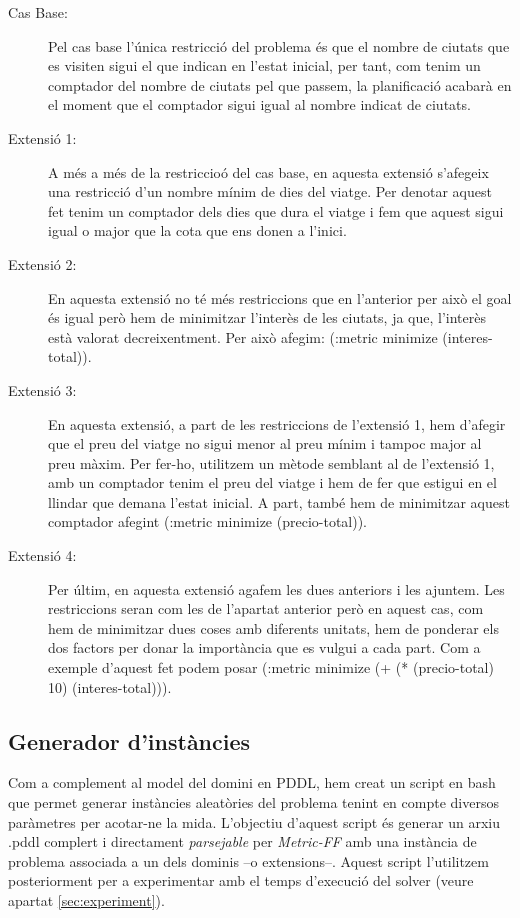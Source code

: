 \documentclass[11pt,a4paper]{article}
\begin{document}
\begin{description}
\item[Cas Base:] Pel cas base l'única restricció del problema és que el nombre de ciutats que es visiten sigui el que indican en l'estat inicial, per tant, com tenim un comptador del nombre de ciutats pel que passem, la planificació acabarà en el moment que el comptador sigui igual al nombre indicat de ciutats.

\item[Extensió 1:] A més a més de la restriccioó del cas base, en aquesta extensió s'afegeix una restricció d'un nombre mínim de dies del viatge. Per denotar aquest fet tenim un comptador dels dies que dura el viatge i fem que aquest sigui igual o major que la cota que ens donen a l'inici.

\item[Extensió 2:] En aquesta extensió no té més restriccions que en l'anterior per això el goal és igual però hem de minimitzar l'interès de les ciutats, ja que, l'interès està valorat decreixentment. Per això afegim: (:metric minimize (interes-total)).
\item[Extensió 3:] En aquesta extensió, a part de les restriccions de l'extensió 1, hem d'afegir que el preu del viatge no sigui menor al preu mínim i tampoc major al preu màxim. Per fer-ho, utilitzem un mètode semblant al de l'extensió 1, amb un comptador tenim el preu del viatge i hem de fer que estigui en el llindar que demana l'estat inicial.
A part, també hem de minimitzar aquest comptador afegint (:metric minimize (precio-total)).
\item[Extensió 4:] Per últim, en aquesta extensió agafem les dues anteriors i les ajuntem. Les restriccions seran com les de l'apartat anterior però en aquest cas, com hem de minimitzar dues coses amb diferents unitats, hem de ponderar els dos factors per donar la importància que es vulgui a cada part. Com a exemple d'aquest fet podem posar (:metric minimize (+ (* (precio-total) 10) (interes-total))).
\end{description}


\subsection{Generador d'instàncies}
\label{sec:script}

Com a complement al model del domini en PDDL, hem creat un script en bash que permet generar instàncies aleatòries del problema tenint en compte diversos paràmetres per acotar-ne la mida. L'objectiu d'aquest script és generar un arxiu .pddl complert i directament \emph{parsejable} per \emph{Metric-FF} amb una instància de problema associada a un dels dominis --o extensions--. Aquest script l'utilitzem posteriorment per a experimentar amb el temps d'execució del solver (veure apartat \ref{sec:experiment}).\\
\end{document}
